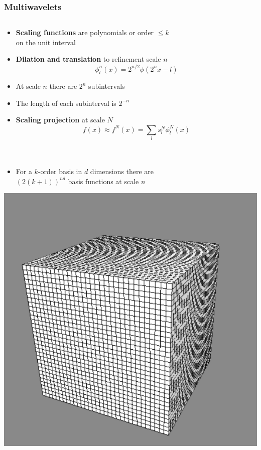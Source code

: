 \begin{frame}
\frametitle{Multiwavelets}
\begin{columns}

\begin{column}[b]{0.55\linewidth}
\begin{itemize}
    \item   \textbf{Scaling functions} are polynomials or order $\leq k$\\
	    on the unit interval
    \item   \textbf{Dilation and translation} to refinement scale $n$
	    \begin{equation}
		\nonumber
		\phi_l^n(x) = 2^{n/2}\phi(2^nx-l)
	    \end{equation}
    \item   At scale $n$ there are $2^n$ subintervals
    \item   The length of each subinterval is $2^{-n}$
    \item   \textbf{Scaling projection} at scale $N$
	    \begin{equation}
		\nonumber
		f(x) \approx f^N(x) = \sum_l s_l^N \phi_l^N(x)
	    \end{equation}
	    \ \\
	    \ \\
    \item   For a $k$-order basis in $d$ dimensions there are\\
	    $\left(2(k+1)\right)^{nd}$ basis functions at scale $n$\\
\end{itemize}
\centering
\includegraphics[scale=0.2]{figures/unifgrid.pdf}
\end{column}


\end{columns}
\end{frame}
